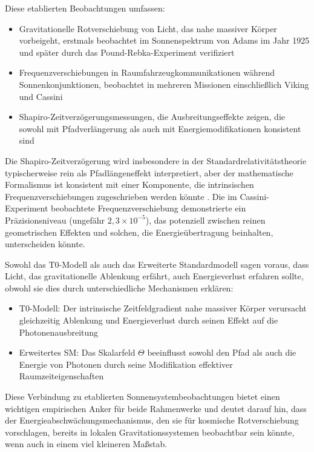 \documentclass[12pt,a4paper]{article}
\begin{document}
	Diese etablierten Beobachtungen umfassen:
	
	\begin{itemize}
		\item Gravitationelle Rotverschiebung von Licht, das nahe massiver Körper vorbeigeht, erstmals beobachtet im Sonnenspektrum von Adams im Jahr 1925 \cite{Adams1925} und später durch das Pound-Rebka-Experiment verifiziert \cite{Pound1960}
		\item Frequenzverschiebungen in Raumfahrzeugkommunikationen während Sonnenkonjunktionen, beobachtet in mehreren Missionen einschließlich Viking und Cassini \cite{Bertotti2003}
		\item Shapiro-Zeitverzögerungsmessungen, die Ausbreitungseffekte zeigen, die sowohl mit Pfadverlängerung als auch mit Energiemodifikationen konsistent sind \cite{Shapiro1971}
	\end{itemize}
	
	Die Shapiro-Zeitverzögerung wird insbesondere in der Standardrelativitätstheorie typischerweise rein als Pfadlängeneffekt interpretiert, aber der mathematische Formalismus ist konsistent mit einer Komponente, die intrinsischen Frequenzverschiebungen zugeschrieben werden könnte \cite{Moyer2000, Will2014}. Die im Cassini-Experiment beobachtete Frequenzverschiebung \cite{Bertotti2003} demonstrierte ein Präzisionsniveau (ungefähr \(2,3 \times 10^{-5}\)), das potenziell zwischen reinen geometrischen Effekten und solchen, die Energieübertragung beinhalten, unterscheiden könnte.
	
	Sowohl das T0-Modell als auch das Erweiterte Standardmodell sagen voraus, dass Licht, das gravitationelle Ablenkung erfährt, auch Energieverlust erfahren sollte, obwohl sie dies durch unterschiedliche Mechanismen erklären:
	
	\begin{itemize}
		\item T0-Modell: Der intrinsische Zeitfeldgradient nahe massiver Körper verursacht gleichzeitig Ablenkung und Energieverlust durch seinen Effekt auf die Photonenausbreitung
		\item Erweitertes SM: Das Skalarfeld \(\Theta\) beeinflusst sowohl den Pfad als auch die Energie von Photonen durch seine Modifikation effektiver Raumzeiteigenschaften
	\end{itemize}
	
	Diese Verbindung zu etablierten Sonnensystembeobachtungen bietet einen wichtigen empirischen Anker für beide Rahmenwerke und deutet darauf hin, dass der Energieabschwächungsmechanismus, den sie für kosmische Rotverschiebung vorschlagen, bereits in lokalen Gravitationssystemen beobachtbar sein könnte, wenn auch in einem viel kleineren Maßstab.
	
\end{document}
